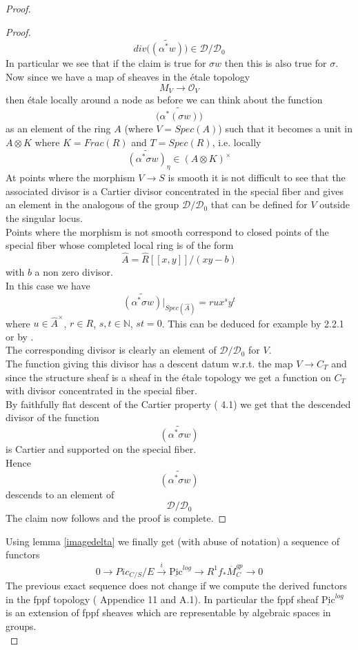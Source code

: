 \documentclass{amsart}
\theoremstyle{definition}
\numberwithin{equation}{section}
\begin{document}
\begin{proof}
\begin{proof}
$$
div\big(\widetilde{(\alpha^*w)}\big)\in\mathcal{D}/\mathcal{D}_0
$$
\noindent In particular we see that if the claim is true for $\sigma w$ then this is also true for $\sigma$.
Now since we have a map of sheaves in the \'etale topology
$$
M_V{\rightarrow} {\mathcal{O}}_V
$$
\noindent then \'etale locally around a node as before we can think about the function 
$$
\widetilde{\big(\alpha^{*}(\sigma w)\big)}
$$
\noindent as an element of the ring $A$ (where $V=Spec(A)$) such that it becomes a unit in $A\otimes K$ where $K=Frac(R)$ and $T=Spec(R)$, i.e. locally
$$
\widetilde{(\alpha^{*}\sigma w)}_{\eta}\in (A\otimes K)^{\times}
$$
\noindent 
At points where the morphism $V{\rightarrow} S$ is smooth it is not difficult to see that the associated divisor is a Cartier divisor concentrated in the special fiber and gives an element in the analogous of the group $\mathcal{D}/\mathcal{D}_0$ that can be defined for $V$ outside the singular locus. \\
Points where the morphism is not smooth correspond to closed points of the special fiber whose completed local ring is of the form
$$
\hat{A}=\hat{R}[[x,y ]]/(xy -b)
$$
\noindent with $b$ a non zero divisor. \\
In this case we have
$$
\widetilde{(\alpha^{*}\sigma w)}|_{Spec(\hat{A})} = rux^sy^t
$$
\noindent where $u\in \hat{A}^{\times}$, $r\in R$, $s,t\in{\mathbb{N}}$, $st=0$. This can be deduced for example by \cite{th} 2.2.1 or by \cite{hol}.\\ The corresponding divisor is clearly an element of $\mathcal{D}/\mathcal{D}_0$ for $V$.\\

\noindent The function giving this divisor has a descent datum w.r.t. the map $V{\rightarrow} C_T$ and since the structure sheaf is a sheaf in the \'etale topology we get a function on $C_T$ with divisor concentrated in the special fiber.\\
By faithfully flat descent of the Cartier property (\cite{hol} 4.1) we get that the descended divisor of the function
$$
\widetilde{(\alpha^{*}\sigma w)}
$$
\noindent is Cartier and supported on the special fiber.\\
\noindent Hence
$$
\widetilde{(\alpha^{*}\sigma w)}$$
\noindent descends to an element of
$$
\mathcal{D}/\mathcal{D}_0
$$
\noindent The claim now follows and the proof is complete.
\end{proof}

\noindent Using lemma \ref{imagedelta} we finally get (with abuse of notation) a sequence of functors 
\begin{equation}\label{beautifulextension}
    0{\rightarrow} Pic_{C/S}/E\stackrel{i}{\rightarrow} {\underline{\mbox{Pic}}^{log}}{\rightarrow} R^{1}f_{*}\overline{M}_{C}^{gp}{\rightarrow} 0 
\end{equation}
\noindent The previous exact sequence does not change if we compute the derived functors in the fppf topology (\cite{br3} Appendice 11 and \cite{ollog} A.1).
In particular the fppf sheaf ${\underline{\mbox{Pic}}^{log}}$ is an extension of fppf sheaves which are representable by algebraic spaces in groups. 
\\ 


\end{proof}
\end{document}

